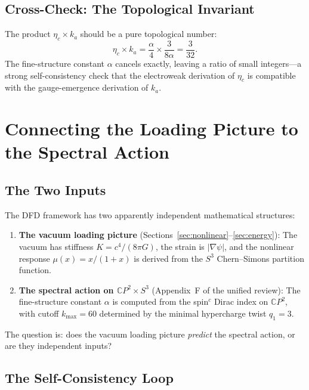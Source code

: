 \documentclass[11pt]{article}
\begin{document}
\subsection{Cross-Check: The Topological Invariant}

The product $\eta_c \times k_a$ should be a pure topological number:
\begin{equation}
\eta_c\times k_a = \frac{\alpha}{4}\times\frac{3}{8\alpha} = \frac{3}{32}.
\end{equation}
The fine-structure constant $\alpha$ cancels exactly, leaving a ratio
of small integers---a strong self-consistency check that the electroweak
derivation of $\eta_c$ is compatible with the gauge-emergence derivation
of $k_a$.

\section{Connecting the Loading Picture to the Spectral Action}
\label{sec:spectral}

\subsection{The Two Inputs}

The DFD framework has two apparently independent mathematical structures:

\begin{enumerate}
\item \textbf{The vacuum loading picture} (Sections~\ref{sec:nonlinear}--\ref{sec:energy}):
The vacuum has stiffness $K = c^4/(8\pi G)$, the strain is $|\nabla\psi|$,
and the nonlinear response $\mu(x) = x/(1+x)$ is derived from the $S^3$
Chern--Simons partition function.

\item \textbf{The spectral action on $\mathbb{C}P^2\times S^3$}
(Appendix~F of the unified review):
The fine-structure constant $\alpha$ is computed from the spin$^c$ Dirac
index on $\mathbb{C}P^2$, with cutoff $k_{\max} = 60$ determined by
the minimal hypercharge twist $q_1 = 3$.
\end{enumerate}

The question is: does the vacuum loading picture \emph{predict} the
spectral action, or are they independent inputs?

\subsection{The Self-Consistency Loop}
\end{document}
